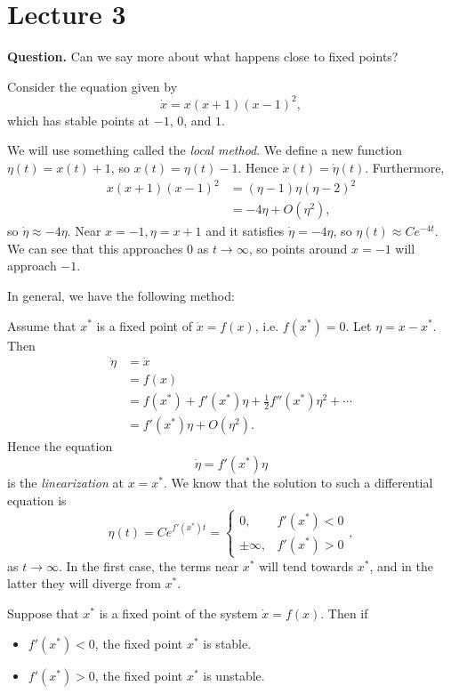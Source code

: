 \documentclass[class=article, crop=false]{standalone}
\begin{document}
  \section{Lecture 3}
  \textbf{Question.} Can we say more about what happens close to fixed points?
  \begin{example}{} Consider the equation given by
    \[
      \dot{x} = x(x + 1)(x - 1)^2,
    \]
    which has stable points at $-1$, $0$, and $1$. \par
    We will use something called the \emph{local method}. We define a new function $\eta(t) = x(t) + 1$, so $x(t) = \eta(t) - 1$. Hence $\dot{x}(t) = \dot{\eta}(t)$. Furthermore,
    \begin{align*}
      x(x + 1)(x - 1)^2 &= (\eta - 1)\eta(\eta - 2)^2 \\
                        &= -4\eta + O(\eta^2), \tag{$\eta\to 0$}
    \end{align*}
    so $\dot{\eta}\approx -4\eta$. Near $x = -1, \eta = x + 1$ and it satisfies $\dot{\eta} = -4\eta$, so $\eta(t)\approx Ce^{-4t}$. We can see that this approaches $0$ as $t\to\infty$, so points around $x = -1$ will approach $-1$.
  \end{example}
  In general, we have the following method: \par
  Assume that $x^*$ is a fixed point of $\dot{x} = f(x)$, i.e. $f(x^*) = 0$. Let $\eta = x - x^*$. Then
  \begin{align*}
    \dot{\eta} &= \dot{x} \\
            &= f(x) \\
            &= f(x^*) + f'(x^*)\eta + \frac{1}{2}f''(x^*)\eta^2 + \dotsb \\
            &= f'(x^*)\eta + O(\eta^2). \tag{$\eta\to 0$}
  \end{align*}
  Hence the equation
  \[
    \dot{\eta} = f'(x^*)\eta
  \]
  is the \emph{linearization} at $x = x^*$. We know that the solution to such a differential equation is
  \[
    \eta(t) = Ce^{f'(x^*)t} = \begin{cases}
      0, & f'(x^*) < 0 \\
      \pm\infty, & f'(x^*) > 0
    \end{cases},
  \]
  as $t\to\infty$. In the first case, the terms near $x^*$ will tend towards $x^*$, and in the latter they will diverge from $x^*$.
  \begin{theorem}{}
    Suppose that $x^*$ is a fixed point of the system $\dot{x} = f(x)$. Then if
    \begin{itemize}
      \item $f'(x^*) < 0$, the fixed point $x^*$ is stable.
      \item $f'(x^*) > 0$, the fixed point $x^*$ is unstable.
    \end{itemize}
  \end{theorem}
\end{document}
